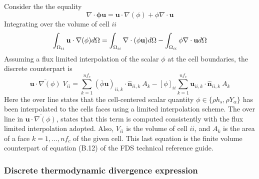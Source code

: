 \documentclass[12pt]{article}
\begin{document}
Consider the the equality
%
\begin{equation}
    \nabla \cdot \mathbf{\phi u} = \mathbf{u} \cdot \nabla (\phi) + \phi \nabla \cdot \mathbf{u} \label{eq:advforms}
\end{equation}
%
Integrating over the volume of cell $ii$
%
\begin{equation}
    \int_{\Omega_{ii}} {\mathbf{u} \cdot \nabla(\phi)} d\Omega =
    \int_{\Omega_{ii}} \nabla \cdot ({\phi} \mathbf{u}) d\Omega -
    \int_{\Omega_{ii}} \phi \nabla \cdot \mathbf{u} d\Omega \label{eq:flxlim1} \\
\end{equation}
Assuming a flux limited interpolation of the scalar $\phi$ at the cell boundaries, the discrete counterpart is
%
\begin{equation}
    \overline{\mathbf{u} \cdot \nabla(\phi)} \; V_{ii} =
    \sum_{k=1}^{nf_c} (\overline{\phi} \mathbf{u})_{ii,k} \cdot \hat{\mathbf{n}}_{ii,k} \: A_k -
    [\phi]_{ii} \sum_{k=1}^{nf_c} \mathbf{u}_{ii,k} \cdot \hat{\mathbf{n}}_{ii,k} \: A_k \label{eq:flxlim2}
\end{equation}
%
Here the over line states that the cell-centered scalar quantity $\phi \in \{\rho h_s, \rho Y_\alpha\}$ has been interpolated to the cells faces using a limited interpolation scheme. The over line in $\overline{\mathbf{u} \cdot \nabla(\phi)}$, states that this term is computed consistently with the flux limited interpolation adopted. Also, $V_{ii}$ is the volume of cell $ii$, and $A_k$ is the area of a face $k=1,...,nf_c$ of the given cell. This last equation is the finite volume counterpart of equation (B.12) of the FDS technical reference guide.

\subsubsection{Discrete thermodynamic divergence expression}
\end{document}
